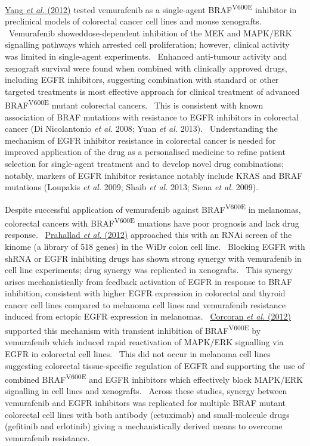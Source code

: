 \hyperlink{ENREF115}{Yang}\hyperlink{ENREF115}{\textit{ et
al.}}\hyperlink{ENREF115}{ (2012)} tested vemurafenib as a single-agent
BRAF\textsuperscript{V600E} inhibitor in preclinical models of
colorectal cancer cell lines and mouse xenografts. \ Vemurafenib
showeddose-dependent inhibition of the MEK and MAPK/ERK signalling
pathways which arrested cell proliferation; however, clinical activity
was limited in single-agent experiments. \ Enhanced anti-tumour
activity and xenograft survival were found when combined with
clinically approved drugs, including EGFR inhibitors, suggesting
combination with standard or other targeted treatments is most
effective approach for clinical treatment of advanced
BRAF\textsuperscript{V600E} mutant colorectal cancers. \ This is
consistent with known association of BRAF mutations with resistance to
EGFR inhibitors in colorectal cancer (Di Nicolantonio\textit{ et al.}
2008; Yuan\textit{ et al.} 2013). \ Understanding the mechanism of EGFR
inhibitor resistance in colorectal cancer is needed for improved
application of the drug as a personalised medicine to refine patient
selection for single-agent treatment and to develop novel drug
combinations; notably, markers of EGFR inhibitor resistance notably
include KRAS and BRAF mutations (Loupakis\textit{ et al.} 2009;
Shaib\textit{ et al.} 2013; Siena\textit{ et al.} 2009). \ 


Despite successful application of vemurafenib against
BRAF\textsuperscript{V600E} in melanomas, colorectal cancers with
BRAF\textsuperscript{V600E} muations have poor prognosis and lack drug
response. \ \hyperlink{ENREF80}{Prahallad}\hyperlink{ENREF80}{\textit{
et al.}}\hyperlink{ENREF80}{ (2012)} approached this with an RNAi
screen of the kinome (a library of 518 genes) in the WiDr colon cell
line. \ Blocking EGFR with shRNA or EGFR inhibiting drugs has shown
strong synergy with vemurafenib in cell line experiments; drug synergy
was replicated in xenografts. \ This synergy arises mechanistically
from feedback activation of EGFR in response to BRAF inhibition,
consistent with higher EGFR expression in colorectal and thyroid cancer
cell lines compared to melanoma cell lines and vemurafenib resistance
induced from ectopic EGFR expression in melanomas.
\ \hyperlink{ENREF24}{Corcoran}\hyperlink{ENREF24}{\textit{ et
al.}}\hyperlink{ENREF24}{ (2012)} supported this mechanism with
transient inhibition of BRAF\textsuperscript{V600E} by vemurafenib
which induced rapid reactivation of MAPK/ERK signalling via EGFR in
colorectal cell lines. \ This did not occur in melanoma cell lines
suggesting colorectal tissue-specific regulation of EGFR and supporting
the use of combined BRAF\textsuperscript{V600E} and EGFR inhibitors
which effectively block MAPK/ERK signalling in cell lines and
xenografts. \ Across these studies, synergy between vemurafenib and
EGFR inhibitors was replicated for multiple BRAF mutant colorectal cell
lines with both antibody (cetuximab) and small-molecule drugs
(gefitinib and erlotinib) giving a mechanistically derived means to
overcome vemurafenib resistance. \ 


